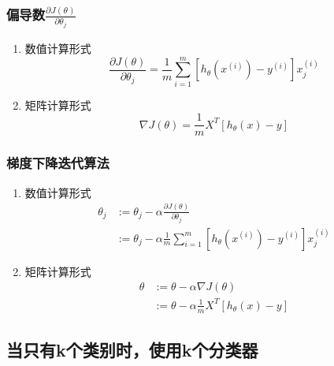\subsubsection{偏导数$\frac{\partial J(\theta)}{\partial \theta_j}$}
\begin{enumerate}
\item 数值计算形式
\begin{equation}
	\frac{\partial J(\theta)}{\partial \theta_j} =
	    \frac{1}{m} \sum_{i=1}^m \left[h_\theta(x^{(i)}) - y^{(i)}\right] x_j^{(i)}
\end{equation}

\item 矩阵计算形式
\begin{equation}
	\nabla J(\theta) = \frac{1}{m} X^T \left[h_\theta(x) - y\right]
\end{equation}
\end{enumerate}


\subsubsection{梯度下降迭代算法}
\begin{enumerate}
\item 数值计算形式
\begin{equation}\begin{aligned}
	\theta_j &:= \theta_j - \alpha\frac{\partial J(\theta)}{\partial \theta_j} \\
	    &:= \theta_j - \alpha \frac{1}{m} \sum_{i=1}^m \left[h_\theta(x^{(i)}) - y^{(i)}\right] x_j^{(i)}
\end{aligned}\end{equation}

\item 矩阵计算形式
\begin{equation}\begin{aligned}
	\theta &:= \theta - \alpha\nabla J(\theta) \\
		&:= \theta - \alpha \frac{1}{m} X^T \left[h_\theta(x) - y\right]
\end{aligned}\end{equation}
\end{enumerate}



\subsection{当只有k个类别时，使用k个分类器}
